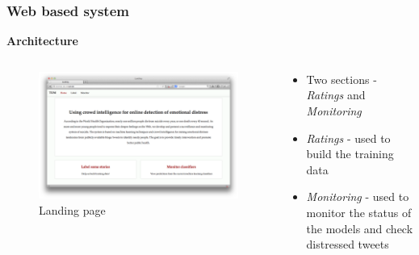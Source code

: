 \documentclass{beamer}
\begin{document}
    \begin{frame}
        \frametitle{Web based system}
        \begin{center}
            \textbf{Architecture}
        \end{center}
        \begin{columns}
            \begin{column}{0.5\textwidth}
                \begin{figure}
                    \centering
                    \includegraphics[width=\textwidth]{figures/landing.png}
                    \caption{Landing page}
                \end{figure}
            \end{column}
            \begin{column}{0.5\textwidth}
                \begin{itemize}
                    \item{Two sections - \emph{Ratings} and \emph{Monitoring}}
                    \item{\emph{Ratings} - used to build the training data}
                    \item{\emph{Monitoring} - used to monitor the status of the models and check distressed tweets}
                \end{itemize}
            \end{column}
        \end{columns}
    \end{frame}
    
\end{document}
